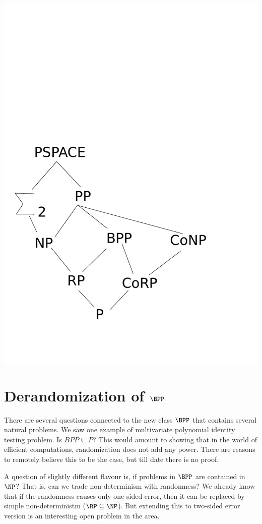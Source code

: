 \begin{center}
\includegraphics[scale=0.3]{Lecture11-Princy/hie3}
\end{center}
\vspace{-10mm}

\section{Derandomization of $\BPP$}
There are several questions connected to the new class $\BPP$ that contains several natural problems. We saw one example of multivariate polynomial identity testing problem. Is $BPP \subseteq P$? This would amount to showing that in the world of efficient computations, randomization does not add any power. There are reasons to remotely believe this to be the case, but till date there is no proof. 

A question of slightly different flavour is, if problems in $\BPP$ are contained in $\NP$? That is, can we trade non-determinism with randomness? We already know that if the randomness causes only one-sided error, then it can be replaced by simple non-deterministm ($\RP \subseteq \NP$). But extending this to two-sided error version is an interesting open problem in the area. 

